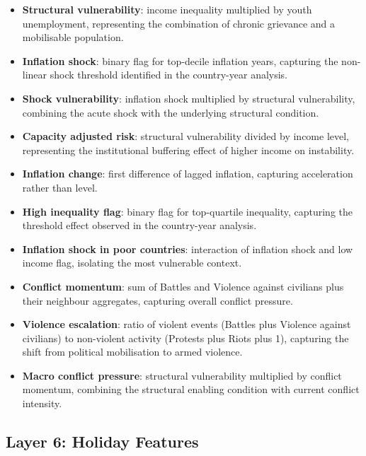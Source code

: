 \documentclass[12pt,a4paper]{article}
\begin{document}
\begin{itemize}
    \item \textbf{Structural vulnerability}: income inequality multiplied
          by youth unemployment, representing the combination of
          chronic grievance and a mobilisable population.
    \item \textbf{Inflation shock}: binary flag for top-decile inflation
          years, capturing the non-linear shock threshold identified
          in the country-year analysis.
    \item \textbf{Shock vulnerability}: inflation shock multiplied by
          structural vulnerability, combining the acute shock with the
          underlying structural condition.
    \item \textbf{Capacity adjusted risk}: structural vulnerability
          divided by income level, representing the institutional
          buffering effect of higher income on instability.
    \item \textbf{Inflation change}: first difference of lagged
          inflation, capturing acceleration rather than level.
    \item \textbf{High inequality flag}: binary flag for top-quartile
          inequality, capturing the threshold effect observed in the
          country-year analysis.
    \item \textbf{Inflation shock in poor countries}: interaction of
          inflation shock and low income flag, isolating the most
          vulnerable context.
    \item \textbf{Conflict momentum}: sum of Battles and Violence
          against civilians plus their neighbour aggregates, capturing
          overall conflict pressure.
    \item \textbf{Violence escalation}: ratio of violent events
          (Battles plus Violence against civilians) to non-violent
          activity (Protests plus Riots plus 1), capturing the
          shift from political mobilisation to armed violence.
    \item \textbf{Macro conflict pressure}: structural vulnerability
          multiplied by conflict momentum, combining the structural
          enabling condition with current conflict intensity.
\end{itemize}

\subsection{Layer 6: Holiday Features}
\end{document}
